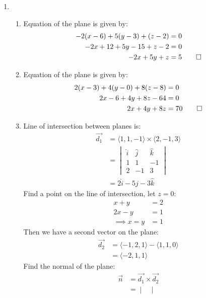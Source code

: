 \documentclass[12pt, a4paper]{article}
\begin{document}
\begin{enumerate}[Q\arabic*.]
  \item 
    \begin{enumerate}[(\alph*)]
      \item Equation of the plane is given by:
        \begin{align*}
          -2(x-6) +5(y-3) + (z-2) &= 0\\
          -2x + 12 + 5y - 15 + z - 2 &= 0\\
          -2x + 5y + z &= 5 \qed
        \end{align*}
      \item Equation of the plane is given by:
        \begin{align*}
          2(x-3) + 4(y-0) + 8(z-8) &= 0\\
          2x - 6 + 4y + 8z - 64 &= 0\\
          2x + 4y + 8z &= 70\qed
        \end{align*}
      \item Line of intersection between planes is:
        \begin{align*}
          \vec{d_1} &= \langle 1,1,-1\rangle \times \langle 2,-1,3\rangle\\
                    &= \begin{vmatrix}
                      \hat{i} & \hat{j} & \hat{k}\\
                      1 & 1 & -1\\
                      2 & -1 & 3
                    \end{vmatrix}\\
                    &= 2\hat{i} - 5\hat{j} -3\hat{k}
        \end{align*}
        Find a point on the line of intersection, let $z=0$:
        \begin{align*}
          x+y&=2\\
          2x-y&=1\\
          \implies x=y&=1 
        \end{align*}
        Then we have a second vector on the plane:
        \begin{align*}
          \vec{d_2} &= \langle -1,2,1\rangle - \langle 1,1,0\rangle\\
                    &= \langle -2,1,1\rangle
        \end{align*}
        Find the normal of the plane:
        \begin{align*}
          \vec{n} &= \vec{d_1} \times \vec{d_2}\\
                  &= \begin{vmatrix}

\end{vmatrix}
\end{align*}
\end{enumerate}
\end{enumerate}
\end{document}
